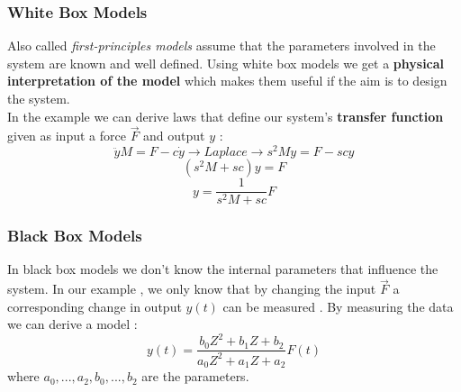 \subsubsection{White Box Models}
Also called \textit{first-principles models} assume that the parameters involved in the system are known and well defined. Using white box models we get a \textbf{physical interpretation of the model} which makes them useful if the aim is to design the system.\\
In the example we can derive laws that define our system's \textbf{transfer function} given as input a force $ \vec{F} $ and output $ y $ :  $$ \ddot yM = F - c \dot y \rightarrow Laplace \rightarrow  s^2My = F -scy $$ $$ (s^2M + sc )y = F $$ $$ y = \frac{1}{s^2M + sc} F $$

\subsubsection{Black Box Models}
In black box models we don't know the internal parameters that influence the system. 
In our example , we only know that by changing the input $ \vec{F} $ a corresponding change in output $ y(t) $ can be measured . By measuring the data we can derive a model :  $$ y(t) =  \frac{b_0Z^2 + b_1Z+ b_2}{a_0Z^2 + a_1Z + a_2} F(t) $$ where 
$ a_0,...,a_2 , b_0 ,..., b_2  $ are the parameters. 

